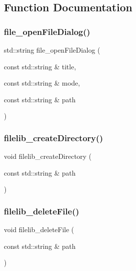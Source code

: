 \subsection{Function Documentation}
\mbox{\label{namespaceplatform_aa812fb80e0cb15f75d35975ea91e8f2b}} 
\subsubsection{\texorpdfstring{file\+\_\+open\+File\+Dialog()}{file\_openFileDialog()}}
{\footnotesize\ttfamily std\+::string file\+\_\+open\+File\+Dialog (\begin{DoxyParamCaption}\item[{const std\+::string \&}]{title,  }\item[{const std\+::string \&}]{mode,  }\item[{const std\+::string \&}]{path }\end{DoxyParamCaption})}

\mbox{\label{namespaceplatform_aa30655cd42c277a7c5ed7aba21cf0050}} 
\subsubsection{\texorpdfstring{filelib\+\_\+create\+Directory()}{filelib\_createDirectory()}}
{\footnotesize\ttfamily void filelib\+\_\+create\+Directory (\begin{DoxyParamCaption}\item[{const std\+::string \&}]{path }\end{DoxyParamCaption})}

\mbox{\label{namespaceplatform_a50db655854102498e7bbc1d5f409a29f}} 
\subsubsection{\texorpdfstring{filelib\+\_\+delete\+File()}{filelib\_deleteFile()}}
{\footnotesize\ttfamily void filelib\+\_\+delete\+File (\begin{DoxyParamCaption}\item[{const std\+::string \&}]{path }\end{DoxyParamCaption})}

